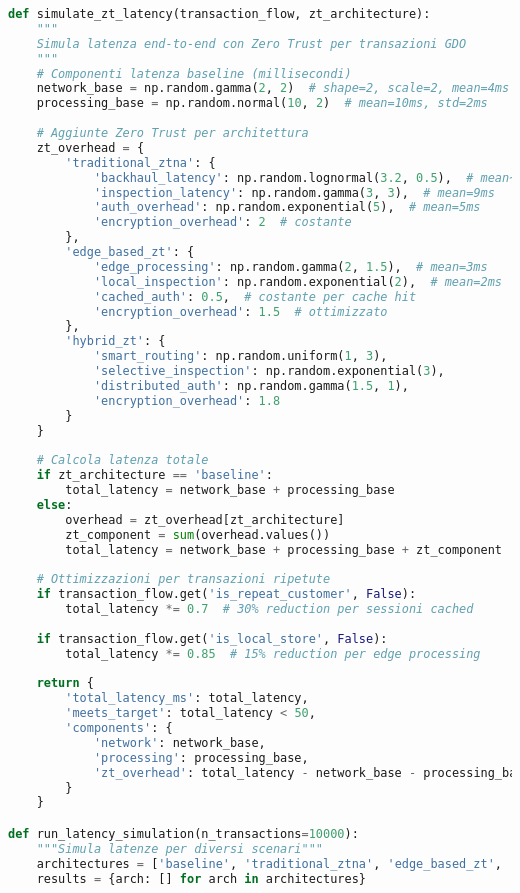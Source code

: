 \begin{lstlisting}[language=Python, caption=Simulazione Latenza con Architetture Zero Trust]
def simulate_zt_latency(transaction_flow, zt_architecture):
    """
    Simula latenza end-to-end con Zero Trust per transazioni GDO
    """
    # Componenti latenza baseline (millisecondi)
    network_base = np.random.gamma(2, 2)  # shape=2, scale=2, mean=4ms
    processing_base = np.random.normal(10, 2)  # mean=10ms, std=2ms
    
    # Aggiunte Zero Trust per architettura
    zt_overhead = {
        'traditional_ztna': {
            'backhaul_latency': np.random.lognormal(3.2, 0.5),  # mean~24ms
            'inspection_latency': np.random.gamma(3, 3),  # mean=9ms
            'auth_overhead': np.random.exponential(5),  # mean=5ms
            'encryption_overhead': 2  # costante
        },
        'edge_based_zt': {
            'edge_processing': np.random.gamma(2, 1.5),  # mean=3ms
            'local_inspection': np.random.exponential(2),  # mean=2ms
            'cached_auth': 0.5,  # costante per cache hit
            'encryption_overhead': 1.5  # ottimizzato
        },
        'hybrid_zt': {
            'smart_routing': np.random.uniform(1, 3),
            'selective_inspection': np.random.exponential(3),
            'distributed_auth': np.random.gamma(1.5, 1),
            'encryption_overhead': 1.8
        }
    }
    
    # Calcola latenza totale
    if zt_architecture == 'baseline':
        total_latency = network_base + processing_base
    else:
        overhead = zt_overhead[zt_architecture]
        zt_component = sum(overhead.values())
        total_latency = network_base + processing_base + zt_component
    
    # Ottimizzazioni per transazioni ripetute
    if transaction_flow.get('is_repeat_customer', False):
        total_latency *= 0.7  # 30% reduction per sessioni cached
    
    if transaction_flow.get('is_local_store', False):
        total_latency *= 0.85  # 15% reduction per edge processing
    
    return {
        'total_latency_ms': total_latency,
        'meets_target': total_latency < 50,
        'components': {
            'network': network_base,
            'processing': processing_base,
            'zt_overhead': total_latency - network_base - processing_base
        }
    }

def run_latency_simulation(n_transactions=10000):
    """Simula latenze per diversi scenari"""
    architectures = ['baseline', 'traditional_ztna', 'edge_based_zt', 'hybrid_zt']
    results = {arch: [] for arch in architectures}
    

\end{lstlisting}

